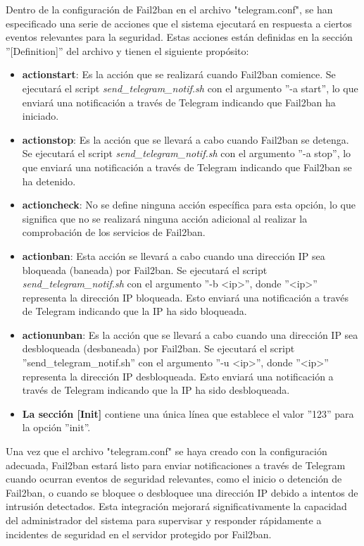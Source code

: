 		Dentro de la configuración de Fail2ban en el archivo "telegram.conf", se han especificado una serie de acciones que el sistema ejecutará en respuesta a ciertos eventos relevantes para la seguridad. Estas acciones están definidas en la sección ''[Definition]'' del archivo y tienen el siguiente propósito:\par
			
			\begin{itemize}
				
			\item \textbf{actionstart}: Es la acción que se realizará cuando Fail2ban comience. Se ejecutará el script \textit{send\_telegram\_notif.sh} con el argumento ''-a start'', lo que enviará una notificación a través de Telegram indicando que Fail2ban ha iniciado.
			
			\item \textbf{actionstop}: Es la acción que se llevará a cabo cuando Fail2ban se detenga. Se ejecutará el script 
			\textit{send\_telegram\_notif.sh} con el argumento ''-a stop'', lo que enviará una notificación a través de Telegram indicando que Fail2ban se ha detenido.
			
			\item \textbf{actioncheck}: No se define ninguna acción específica para esta opción, lo que significa que no se realizará ninguna acción adicional al realizar la comprobación de los servicios de Fail2ban.
			
			\item \textbf{actionban}: Esta acción se llevará a cabo cuando una dirección IP sea bloqueada (baneada) por Fail2ban. Se ejecutará el script \textit{send\_telegram\_notif.sh} con el argumento ''-b <ip>'', donde ''<ip>'' representa la dirección IP bloqueada. Esto enviará una notificación a través de Telegram indicando que la IP ha sido bloqueada.
			
			\item \textbf{actionunban}: Es la acción que se llevará a cabo cuando una dirección IP sea desbloqueada (desbaneada) por Fail2ban. Se ejecutará el script ''send\_telegram\_notif.sh'' con el argumento ''-u <ip>'', donde ''<ip>'' representa la dirección IP desbloqueada. Esto enviará una notificación a través de Telegram indicando que la IP ha sido desbloqueada.
			
			\item \textbf{La sección [Init]} contiene una única línea que establece el valor ''123'' para la opción ''init''.
			
			\end{itemize}	
			Una vez que el archivo "telegram.conf" se haya creado con la configuración adecuada, Fail2ban estará listo para enviar notificaciones a través de Telegram cuando ocurran eventos de seguridad relevantes, como el inicio o detención de Fail2ban, o cuando se bloquee o desbloquee una dirección IP debido a intentos de intrusión detectados. Esta integración mejorará significativamente la capacidad del administrador del sistema para supervisar y responder rápidamente a incidentes de seguridad en el servidor protegido por Fail2ban.
			
